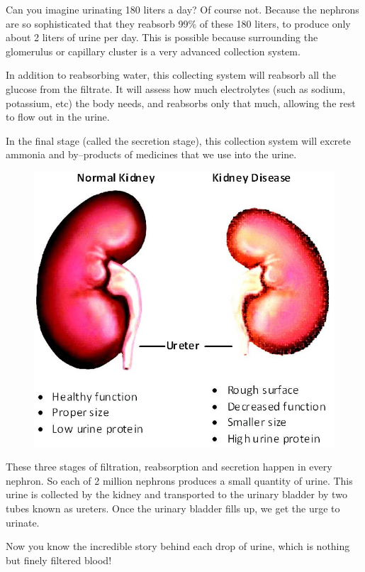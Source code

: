 {Can you imagine urinating 180 liters a day? Of course not. Because the nephrons are so sophisticated that they reabsorb 99\% of these 180 liters, to produce only about 2 liters of urine per day. This is possible because surrounding the glomerulus or capillary cluster is a very advanced collection system.

In addition to reabsorbing water, this collecting system will reabsorb all the glucose from the filtrate. It will assess how much electrolytes (such as sodium, potassium, etc) the body needs, and reabsorbs only that much, allowing the rest to flow out in the urine.

In the final stage (called the secretion stage), this collection system will excrete ammonia and by–products of medicines that we use into the urine.

\begin{figure}
\includegraphics{images/047.jpg}
\end{figure}

These three stages of filtration, reabsorption and secretion happen in every nephron. So each of 2 million nephrons produces a small quantity of urine. This urine is collected by the kidney and transported to the urinary bladder by two tubes known as ureters. Once the urinary bladder fills up, we get the urge to urinate.

Now you know the incredible story behind each drop of urine, which is nothing but finely filtered blood!

}
